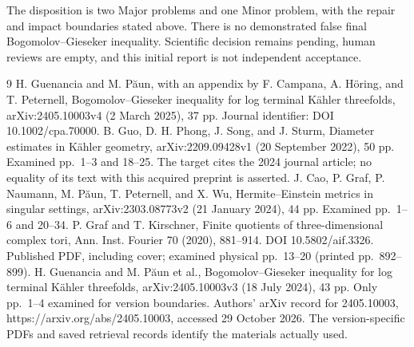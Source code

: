 \documentclass[10pt]{article}
\begin{document}
The disposition is two Major problems and one Minor problem, with the repair and impact boundaries stated above. There is no demonstrated false final Bogomolov–Gieseker inequality. Scientific decision remains pending, human reviews are empty, and this initial report is not independent acceptance.\par
9 H. Guenancia and M. Păun, with an appendix by F. Campana, A. Höring, and T. Peternell, Bogomolov–Gieseker inequality for log terminal Kähler threefolds, arXiv:2405.10003v4 (2 March 2025), 37 pp. Journal identifier: DOI 10.1002/cpa.70000. B. Guo, D. H. Phong, J. Song, and J. Sturm, Diameter estimates in Kähler geometry, arXiv:2209.09428v1 (20 September 2022), 50 pp. Examined pp. 1–3 and 18–25. The target cites the 2024 journal article; no equality of its text with this acquired preprint is asserted. J. Cao, P. Graf, P. Naumann, M. Păun, T. Peternell, and X. Wu, Hermite–Einstein metrics in singular settings, arXiv:2303.08773v2 (21 January 2024), 44 pp. Examined pp. 1–6 and 20–34. P. Graf and T. Kirschner, Finite quotients of three-dimensional complex tori, Ann. Inst. Fourier 70 (2020), 881–914. DOI 10.5802/aif.3326. Published PDF, including cover; examined physical pp. 13–20 (printed pp. 892–899). H. Guenancia and M. Păun et al., Bogomolov–Gieseker inequality for log terminal Kähler threefolds, arXiv:2405.10003v3 (18 July 2024), 43 pp. Only pp. 1–4 examined for version boundaries. Authors’ arXiv record for 2405.10003, https://arxiv.org/abs/2405.10003, accessed 29 October 2026. The version-specific PDFs and saved retrieval records identify the materials actually used.\par
\end{document}
